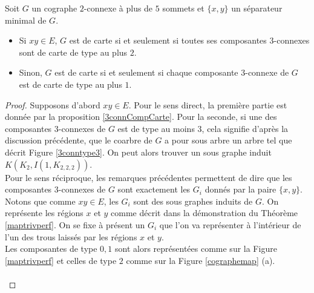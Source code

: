 \documentclass{scrartcl}
\begin{document}
\begin{flushleft}
\begin{theorem}\label{cographe2conn}
    Soit $G$ un cographe $2$-connexe à plus de $5$ sommets et $\{x,y\}$ un séparateur minimal de $G$. 
    \begin{itemize}
        \item Si $xy \in E$, $G$ est de carte si et seulement si toutes ses composantes $3$-connexes sont de carte de type au plus $2$.
        \item Sinon, $G$ est de carte si et seulement si chaque composante $3$-connexe de $G$ est de carte de type au plus $1$.
    \end{itemize}
\end{theorem}

\begin{proof}
    Supposons d'abord $xy \in E$. Pour le sens direct, la première partie est donnée par la proposition \ref{3connCompCarte}. Pour la seconde,
    si une des composantes $3$-connexes de $G$ est de type au moins $3$, cela signifie d'après la discussion précédente, que le coarbre de $G$
    a pour sous arbre un arbre tel que décrit Figure \ref{3conntype3}. On peut alors trouver un sous graphe induit $K(K_2, I(1, K_{2,2,2}))$.\\
    Pour le sens réciproque, les remarques précédentes permettent de dire que les composantes $3$-connexes de $G$ sont exactement les $G_i$
    donnés par la paire $\{x,y\}$. Notons que comme $xy \in E$, les $G_i$ sont des sous graphes induits de $G$. On représente les régions $x$ et
    $y$ comme décrit dans la démonstration du Théorème \ref{maptrivperf}. On se fixe à présent un $G_i$ que l'on va représenter à l'intérieur de
    l'un des trous laissés par les régions $x$ et $y$.\\
    Les composantes de type $0,1$ sont alors représentées comme sur la Figure \ref{maptrivperf} et celles de type $2$ comme sur la
    Figure \ref{cographemap} (a).
    \\~\\


\end{proof}
\end{flushleft}
\end{document}
